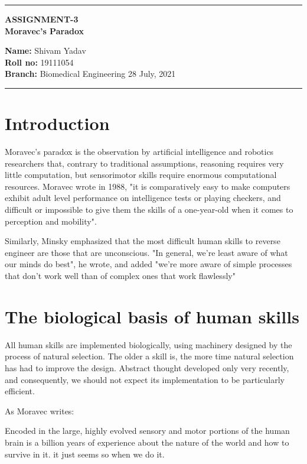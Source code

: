 \documentclass[10pt,a4paper,twoside]{article}
\begin{document}
\begin{center}
\hrule

\vspace{.4cm}
{\bf {\Large ASSIGNMENT-3}}\\
\vspace{.3cm}
{\bf {\huge  Moravec's Paradox }}
\vspace{.3cm}
\end{center}
{\bf Name:}  Shivam Yadav\\
{\bf Roll no:}  19111054 \\
{\bf Branch: }  Biomedical Engineering \hspace{\fill}  28 July, 2021 \\
\hrule

\vspace{.5cm}






\section{Introduction}
Moravec's paradox is the observation by artificial intelligence and robotics researchers that, contrary to traditional assumptions, reasoning requires very little computation, but sensorimotor skills require enormous computational resources. Moravec wrote in 1988, "it is comparatively easy to make computers exhibit adult level performance on intelligence tests or playing checkers, and difficult or impossible to give them the skills of a one-year-old when it comes to perception and mobility".

 Similarly, Minsky emphasized that the most difficult human skills to reverse engineer are those that are unconscious. "In general, we're least aware of what our minds do best", he wrote, and added "we're more aware of simple processes that don't work well than of complex ones that work flawlessly"
\section{The biological basis of human skills  }
All human skills are implemented biologically, using machinery designed by the process of natural selection. The older a skill is, the more time natural selection has had to improve the design. Abstract thought developed only very recently, and consequently, we should not expect its implementation to be particularly efficient.

As Moravec writes:

Encoded in the large, highly evolved sensory and motor portions of the human brain is a billion years of experience about the nature of the world and how to survive in it. it just seems so when we do it.
\end{document}
